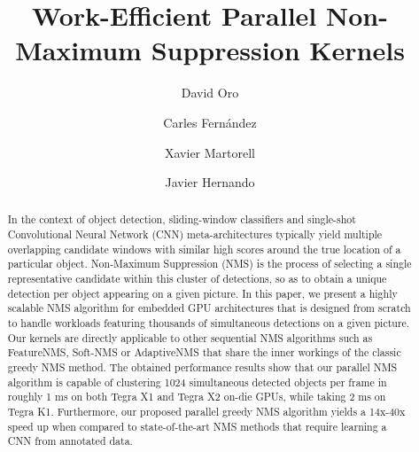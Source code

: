 \documentclass[letterpaper]{comjnl}
\begin{document}


\title[Work-Efficient Parallel Non-Maximum Suppression Kernels]{Work-Efficient Parallel Non-Maximum Suppression Kernels}


\author{David Oro}

\author{Carles Fern\'andez}

\author{Xavier Martorell}

\author{Javier Hernando}









\begin{abstract}
In the context of object detection, sliding-window classifiers and single-shot Convolutional Neural Network (CNN) meta-architectures typically yield multiple 
overlapping candidate windows with similar high scores around the true location of a particular object. Non-Maximum Suppression 
(NMS) is the process of selecting a single representative candidate within this cluster of detections, so as to obtain a unique 
detection per object appearing on a given picture. In this paper, we present a highly scalable NMS algorithm for embedded GPU 
architectures that is designed from scratch to handle workloads featuring thousands of simultaneous detections on a given picture. 
Our kernels are directly applicable to other sequential NMS algorithms such as FeatureNMS, Soft-NMS or AdaptiveNMS 
that share the inner workings of the classic greedy NMS method. The obtained performance results show that our parallel NMS algorithm 
is capable of clustering 1024 simultaneous detected objects per frame in roughly 1 ms on both Tegra X1 and Tegra X2 on-die GPUs, while 
taking 2 ms on Tegra K1. Furthermore, our proposed parallel greedy NMS algorithm yields a 14x-40x speed up when compared to 
state-of-the-art NMS methods that require learning a CNN from annotated data. 
\end{abstract}

\maketitle









\nocite{*}



\end{document}
